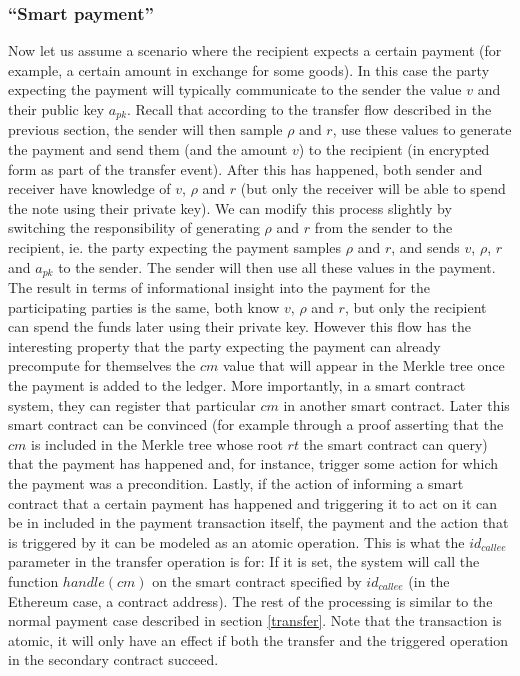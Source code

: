 \documentclass{article}
\begin{document}
\subsubsection{``Smart payment''} \label{smartpayment}
Now let us assume a scenario where the recipient expects a certain payment (for example, a certain amount in exchange for some goods). In this case the party expecting the payment will typically communicate to the sender the value $v$ and their public key $a_{pk}$. Recall that according to the transfer flow described in the previous section, the sender will then sample $\rho$ and $r$, use these values to generate the payment and send them (and the amount $v$) to the recipient (in encrypted form as part of the transfer event). After this has happened, both sender and receiver have knowledge of $v$, $\rho$ and $r$ (but only the receiver will be able to spend the note using their private key). We can modify this process slightly by switching the responsibility of generating $\rho$ and $r$ from the sender to the recipient, ie. the party expecting the payment samples $\rho$ and $r$, and sends $v$, $\rho$, $r$ and $a_{pk}$ to the sender. The sender will then use all these values in the payment. The result in terms of informational insight into the payment for the participating parties is the same, both know $v$, $\rho$ and $r$, but only the recipient can spend the funds later using their private key. However this flow has the interesting property that the party expecting the payment can already precompute for themselves the $cm$ value that will appear in the Merkle tree once the payment is added to the ledger. More importantly, in a smart contract system, they can register that particular $cm$ in another smart contract. Later this smart contract can be convinced (for example through a proof asserting that the $cm$ is included in the Merkle tree whose root $rt$ the smart contract can query) that the payment has happened and, for instance, trigger some action for which the payment was a precondition. Lastly, if the action of informing a smart contract that a certain payment has happened and triggering it to act on it can be in included in the payment transaction itself, the payment and the action that is triggered by it can be modeled as an atomic operation. This is what the $id_{callee}$ parameter in the transfer operation is for: If it is set, the system will call the function $handle(cm)$ on the smart contract specified by $id_{callee}$ (in the Ethereum case, a contract address). The rest of the processing is similar to the normal payment case described in section \ref{transfer}. Note that the transaction is atomic, it will only have an effect if both the transfer and the triggered operation in the secondary contract succeed.
\end{document}
